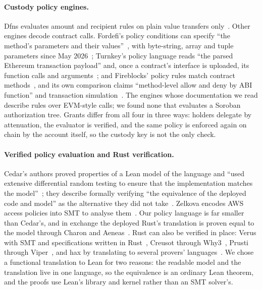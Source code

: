 \paragraph{Custody policy engines.} Dfns evaluates amount and recipient rules
on plain value transfers only~\cite{dfnsPolicies}. Other engines decode
contract calls. Fordefi's policy conditions can specify ``the method's
parameters and their values''~\cite{fordefiPolicies}, with byte-string, array
and tuple parameters since May 2026~\cite{fordefiChangelog}; Turnkey's policy
language reads ``the parsed Ethereum transaction payload'' and, once a
contract's interface is uploaded, its function calls and
arguments~\cite{turnkeyPolicies,turnkeyContracts}; and Fireblocks' policy rules
match contract methods~\cite{fireblocksPolicyApi}, and its own comparison
claims ``method-level allow and deny by ABI function'' and transaction
simulation~\cite{fireblocksPolicy}. The engines whose documentation we read
describe rules over EVM-style calls; we found none that evaluates a Soroban
authorization tree. Grants differ from all four in three ways: holders
delegate by attenuation, the evaluator is verified, and the same policy is
enforced again on chain by the account itself, so the custody key is not the
only check.

\paragraph{Verified policy evaluation and Rust verification.} Cedar's authors
proved properties of a Lean model of the language and ``used extensive
differential random testing to ensure that the implementation matches the
model''~\cite{cedar}; they describe formally verifying ``the equivalence of the
deployed code and model'' as the alternative they did not take~\cite{cedarHow}.
Zelkova encodes AWS access policies into SMT to analyse them~\cite{zelkova}.
Our policy language is far smaller than Cedar's, and in exchange the deployed
Rust's translation is proven equal to the model through Charon and
Aeneas~\cite{charon,aeneas}. Rust can also be verified in place: Verus with
SMT and specifications written in Rust~\cite{verus}, Creusot through
Why3~\cite{creusot}, Prusti through Viper~\cite{prusti}, and hax by
translating to several provers' languages~\cite{hax}. We chose a functional
translation to Lean for two reasons: the readable model and the translation
live in one language, so the equivalence is an ordinary Lean theorem, and the
proofs use Lean's library and kernel rather than an SMT solver's.


